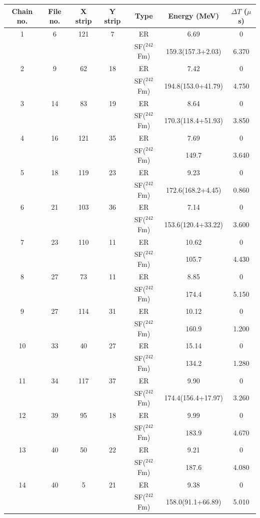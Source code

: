 \documentclass{article}
\begin{document}
\begin{table}[htbp]
\centering
\begin{tabular}{ccccccc}
\hline
Chain no. & File no. & X strip & Y strip & Type & Energy (MeV) & $\Delta T$ ($\mu$s) \\
\hline
1 & 6 & 121 & 7 & ER & 6.69 & 0 \\
 & & & & SF($^{242}$Fm) & 159.3(157.3+2.03) & 6.370 \\
\hline
2 & 9 & 62 & 18 & ER & 7.42 & 0 \\
 & & & & SF($^{242}$Fm) & 194.8(153.0+41.79) & 4.750 \\
\hline
3 & 14 & 83 & 19 & ER & 8.64 & 0 \\
 & & & & SF($^{242}$Fm) & 170.3(118.4+51.93) & 3.850 \\
\hline
4 & 16 & 121 & 35 & ER & 7.69 & 0 \\
 & & & & SF($^{242}$Fm) & 149.7 & 3.640 \\
\hline
5 & 18 & 119 & 23 & ER & 9.23 & 0 \\
 & & & & SF($^{242}$Fm) & 172.6(168.2+4.45) & 0.860 \\
\hline
6 & 21 & 103 & 36 & ER & 7.14 & 0 \\
 & & & & SF($^{242}$Fm) & 153.6(120.4+33.22) & 3.600 \\
\hline
7 & 23 & 110 & 11 & ER & 10.62 & 0 \\
 & & & & SF($^{242}$Fm) & 105.7 & 4.430 \\
\hline
8 & 27 & 73 & 11 & ER & 8.85 & 0 \\
 & & & & SF($^{242}$Fm) & 174.4 & 5.150 \\
\hline
9 & 27 & 114 & 31 & ER & 10.12 & 0 \\
 & & & & SF($^{242}$Fm) & 160.9 & 1.200 \\
\hline
10 & 33 & 40 & 27 & ER & 15.14 & 0 \\
 & & & & SF($^{242}$Fm) & 134.2 & 1.280 \\
\hline
11 & 34 & 117 & 37 & ER & 9.90 & 0 \\
 & & & & SF($^{242}$Fm) & 174.4(156.4+17.97) & 3.260 \\
\hline
12 & 39 & 95 & 18 & ER & 9.99 & 0 \\
 & & & & SF($^{242}$Fm) & 183.9 & 4.670 \\
\hline
13 & 40 & 50 & 22 & ER & 9.21 & 0 \\
 & & & & SF($^{242}$Fm) & 187.6 & 4.080 \\
\hline
14 & 40 & 5 & 21 & ER & 9.38 & 0 \\
 & & & & SF($^{242}$Fm) & 158.0(91.1+66.89) & 5.010 \\
\hline
\end{tabular}
\end{table}
\end{document}
